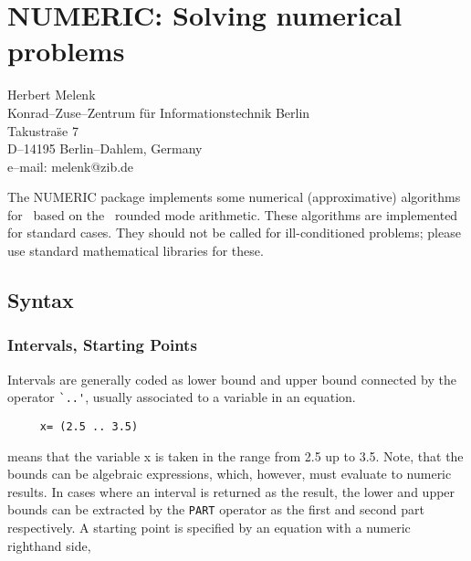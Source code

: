 \chapter{NUMERIC: Solving numerical problems}
\label{NUMERIC}

{\footnotesize
\begin{center}
Herbert Melenk \\
Konrad--Zuse--Zentrum f\"ur Informationstechnik Berlin \\
Takustra\"se 7 \\
D--14195 Berlin--Dahlem, Germany \\[0.05in]
e--mail: melenk@zib.de
\end{center}
}

The {\small NUMERIC} package implements some numerical (approximative)
algorithms for \REDUCE\, based on the \REDUCE\ rounded mode
arithmetic. These algorithms are implemented for standard cases.  They
should not be called for ill-conditioned problems; please use standard
mathematical libraries for these.

\section{Syntax}

\subsection{Intervals, Starting Points}

Intervals are generally coded as lower bound and
upper bound connected by the operator \verb+`..'+, usually
associated to a variable in an
equation.

\begin{verbatim}
     x= (2.5 .. 3.5)
\end{verbatim}

means that the variable x is taken in the range from 2.5 up to
3.5. Note, that the bounds can be algebraic
expressions, which, however, must evaluate to numeric results.
In cases where an interval is returned as the result, the lower
and upper bounds can be extracted by the \verb+PART+ operator
as the first and second part respectively.
A starting point is specified by an equation with a numeric
righthand side,

